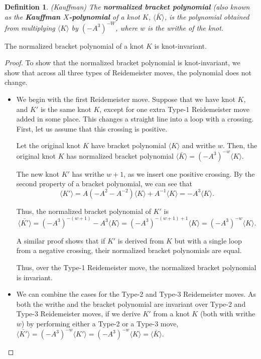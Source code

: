 \documentclass[12pt]{article}
\newtheorem{definition}{Definition}[section]
\newenvironment{theorem}[2][Theorem]{\begin{trivlist}
\item[\hskip \labelsep {\bfseries #1}\hskip \labelsep {\bfseries #2.}]}{\end{trivlist}}
\begin{document}
\begin{definition} {(Kauffman)}
The \textbf{normalized bracket polynomial} (also known as the \textbf{Kauffman $X$-polynomial} of a knot $K$, $\langle \bar{K} \rangle$, is the polynomial obtained from multiplying $\langle K \rangle$ by $(-A^3)^{-W}$, where $w$ is the writhe of the knot. 
\end{definition}
\begin{theorem}{3.1}
The normalized bracket polynomial of a knot $K$ is knot-invariant. 
\end{theorem}
\begin{proof}

To show that the normalized bracket polynomial is knot-invariant, we show that across all three types of Reidemeister moves, the polynomial does not change. 

\begin{itemize}

\item We begin with the first Reidemeister move. Suppose that we have knot $K$, and $K'$ is the same knot $K$, except for one extra Type-1 Reidemeister move added in some place. This changes a straight line into a loop with a crossing. First, let us assume that this crossing is positive. 

Let the original knot $K$ have bracket polynomial $\langle K \rangle$ and writhe $w$. Then, the original knot $K$ has normalized bracket polynomial $\langle \bar{K} \rangle = (-A^3)^{-w} \langle K \rangle$. 

The new knot $K'$ has writhe $w + 1$, as we insert one positive crossing.  By the second property of a bracket polynomial, we can see that $$\langle K' \rangle = A (-A^2 - A^{-2}) \langle K \rangle + A^{-1} \langle K \rangle = -A^{3} \langle K \rangle.$$

Thus, the normalized bracket polynomial of $K'$ is $$\langle \bar{K'} \rangle = (-A^3)^{-(w + 1)} -A^3 \langle K \rangle = (-A^3)^{-(w + 1) + 1} \langle K \rangle = (-A^3)^{-w} \langle K \rangle.$$

A similar proof shows that if $K'$ is derived from $K$ but with a single loop from a negative crossing, their normalized bracket polynomials are equal. 

Thus, over the Type-1 Reidemeister move, the normalized bracket polynomial is invariant. 

\item We can combine the cases for the Type-2 and Type-3 Reidemeister moves. As both the writhe and the bracket polynomial are invariant over Type-2 and Type-3 Reidemeister moves, if we derive $K'$ from a knot $K$ (both with writhe $w$) by performing either a Type-2 or a Type-3 move, $\langle \bar{K'} \rangle = (-A^3)^{-w} \langle K' \rangle = (-A^3)^{-w} \langle K \rangle = \langle \bar{K} \rangle.$


\end{itemize}
\end{proof}
\end{document}
